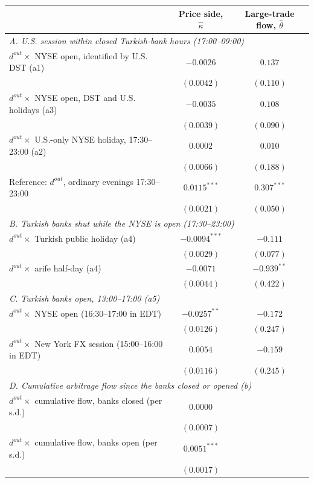 \begin{tabular}{lcc}
\toprule
 & Price side, $\hat\kappa$ & Large-trade flow, $\hat\theta$ \\
\midrule
\multicolumn{3}{l}{\emph{A. U.S. session within closed Turkish-bank hours (17:00--09:00)}} \\
\quad $d^{out}\times$ NYSE open, identified by U.S. DST (a1) & $-0.0026$ & $0.137$ \\
 & $(0.0042)$ & $(0.110)$ \\
\quad $d^{out}\times$ NYSE open, DST and U.S. holidays (a3) & $-0.0035$ & $0.108$ \\
 & $(0.0039)$ & $(0.090)$ \\
\quad $d^{out}\times$ U.S.-only NYSE holiday, 17:30--23:00 (a2) & $0.0002$ & $0.010$ \\
 & $(0.0066)$ & $(0.188)$ \\
\quad Reference: $d^{out}$, ordinary evenings 17:30--23:00 & $0.0115^{***}$ & $0.307^{***}$ \\
 & $(0.0021)$ & $(0.050)$ \\
\multicolumn{3}{l}{\emph{B. Turkish banks shut while the NYSE is open (17:30--23:00)}} \\
\quad $d^{out}\times$ Turkish public holiday (a4) & $-0.0094^{***}$ & $-0.111$ \\
 & $(0.0029)$ & $(0.077)$ \\
\quad $d^{out}\times$ arife half-day (a4) & $-0.0071$ & $-0.939^{**}$ \\
 & $(0.0044)$ & $(0.422)$ \\
\multicolumn{3}{l}{\emph{C. Turkish banks open, 13:00--17:00 (a5)}} \\
\quad $d^{out}\times$ NYSE open (16:30--17:00 in EDT) & $-0.0257^{**}$ & $-0.172$ \\
 & $(0.0126)$ & $(0.247)$ \\
\quad $d^{out}\times$ New York FX session (15:00--16:00 in EDT) & $0.0054$ & $-0.159$ \\
 & $(0.0116)$ & $(0.245)$ \\
\multicolumn{3}{l}{\emph{D. Cumulative arbitrage flow since the banks closed or opened (b)}} \\
\quad $d^{out}\times$ cumulative flow, banks closed (per s.d.) & $0.0000$ &  \\
 & $(0.0007)$ &  \\
\quad $d^{out}\times$ cumulative flow, banks open (per s.d.) & $0.0051^{***}$ &  \\
 & $(0.0017)$ &  \\

\end{tabular}
